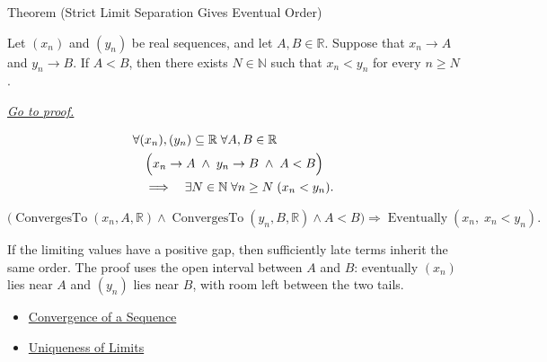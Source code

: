 \begin{theorembox}{Theorem (Strict Limit Separation Gives Eventual Order)}
\begin{theorem}
\label{thm:strict-limit-separation-gives-eventual-order}

Let $(x_n)$ and $(y_n)$ be real sequences, and let $A,B\in\mathbb{R}$.
Suppose that $x_n\to A$ and $y_n\to B$. If $A<B$, then there exists
$N\in\mathbb{N}$ such that $x_n<y_n$ for every $n\ge N$.

\smallskip
\noindent
\hyperref[prf:strict-limit-separation-gives-eventual-order]{\textit{Go to proof.}}
\end{theorem}
\end{theorembox}

\begin{remark*}
\[
\begin{aligned}
&\forall (x_n),(y_n)\subseteq\mathbb{R}\;\forall A,B\in\mathbb{R}\\
&\quad\Bigl(
  x_n\to A
  \;\land\;
  y_n\to B
  \;\land\;
  A<B
\Bigr)\\
&\quad\Longrightarrow\quad
\exists N\in\mathbb{N}\;\forall n\ge N\;(x_n<y_n).
\end{aligned}
\]
\end{remark*}

\begin{remark*}
\[
\bigl(
\operatorname{ConvergesTo}(x_n,A,\mathbb{R})
\land
\operatorname{ConvergesTo}(y_n,B,\mathbb{R})
\land
A<B
\bigr)
\Longrightarrow
\operatorname{Eventually}(x_n,\;x_n<y_n).
\]
\end{remark*}

\begin{remark*}[Interpretation]
If the limiting values have a positive gap, then sufficiently late terms
inherit the same order. The proof uses the open interval between $A$ and $B$:
eventually $(x_n)$ lies near $A$ and $(y_n)$ lies near $B$, with room left
between the two tails.
\end{remark*}

\begin{dependencies}
\begin{itemize}
  \item \hyperref[def:convergent-sequence]{Convergence of a Sequence}
  \item \hyperref[thm:uniqueness-of-limits]{Uniqueness of Limits}
\end{itemize}
\end{dependencies}



